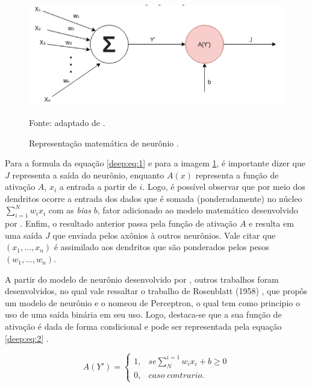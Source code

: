 \begin{figure}[H]
    \centering
    \caption{Representação matemática de neurônio \cite{mcculloch1943logical}.}
    \includegraphics[width=1\linewidth]{recursos/imagens/deep/neuronio_mc.png}
    \label{deep:fig:2}

    \vspace*{1 cm}
    Fonte: adaptado de \cite{mcculloch1943logical}.
\end{figure}

Para a formula da equação \ref{deep:eq:1} e para a imagem \ref{deep:fig:2}, é importante dizer que $J$ representa a saída do neurônio, enquanto $A(x)$ representa a função de ativação $A$, $x_i$ a entrada a partir de $i$. Logo, é possível observar que por meio dos dendritos ocorre a entrada dos dados que é somada (ponderadamente) no núcleo $\sum_{i = 1}^{N} w_ix_i$ com as \textit{bias} $b$, fator adicionado ao modelo matemático desenvolvido por \cite{mcculloch1943logical}. Enfim, o resultado anterior passa pela função de ativação $A$ e resulta em uma saída $J$ que enviada pelos axônios à outros neurônios. Vale citar que $(x_1, ..., x_n)$ é assimilado aos dendritos que são ponderados pelos pesos $(w_1, ..., w_n)$.

A partir do modelo de neurônio desenvolvido por \cite{mcculloch1943logical},  outros trabalhos foram desenvolvidos, no qual vale ressaltar o trabalho de Rosenblatt (1958) \cite{Rosenblatt1958}, que propôs um modelo de neurônio e o nomeou de Perceptron, o qual tem como principio o uso de uma saída binária em seu uso. Logo, destaca-se que a sua função de ativação é dada de forma condicional e pode ser representada pela equação \ref{deep:eq:2} \cite{Rosenblatt1958}.

\begin{equation}
    \label{deep:eq:2}
    A(Y') = \left\{\begin{matrix}
     1,& se \sum_{N}^{i=1} w_i x_i + b \geq 0 \\ 
     0,& caso \;  contrario.
    \end{matrix}\right.
\end{equation}

